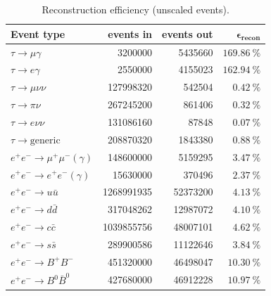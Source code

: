 \documentclass[12pt]{thesis}  %
\begin{document}
\begin{table}[h]
\centering
\begin{tabular}{lrrr}
\textbf{Event type}         & \textbf{events in} & \textbf{events out} & $\mathbf{\epsilon_{\text{recon}}}$ \\ \hline 
\rowcolor[HTML]{EFEFEF} 
$\tau\to\mu\gamma$       & \num{3200000}        & \num{5435660}      & $\SI{169.86}{\percent}$                   \\
\rowcolor[HTML]{EFEFEF} 
$\tau\to e \gamma$      & \num{2550000}       & \num{4155023}       & $\SI{162.94}{\percent}$                            \\
$\tau\to\mu\nu\nu$      & \num{127998320}         & \num{542504}          & $\SI{0.42}{\percent}$           \\
$\tau\to\pi\nu$         & \num{267245200}       & \num{861406}          & $\SI{0.32}{\percent}$            \\
$\tau\to e\nu\nu$       & \num{131086160}        & \num{87848}         & $\SI{0.07}{\percent}$      \\
$\tau\to\text{generic}$  & \num{208870320}       & \num{1843380}          & $\SI{0.88}{\percent}$         \\
$e^+ e^- \to \mu^+ \mu^- (\gamma)$   & \num{148600000}    & \num{5159295}     & $\SI{3.47}{\percent}$   \\
$e^+ e^- \to e^+ e^- (\gamma)$      & \num{15630000}      & \num{370496}       & $\SI{2.37}{\percent}$     \\
$e^+ e^- \to u \bar{u}$       & \num{1268991935}           & \num{52373200}  & $\SI{4.13}{\percent}$ \\
$e^+ e^- \to d \bar{d}$        & \num{317048262}       & \num{12987072}      & $\SI{4.10}{\percent}$       \\
$e^+ e^- \to c \bar{c}$        & \num{1039855756}       & \num{48007101}           & $\SI{4.62}{\percent}$          \\
$e^+ e^- \to s \bar{s}$       & \num{289900586}     & \num{11122646}            & $\SI{3.84}{\percent}$         \\
$e^+ e^- \to B^+ B^-$     & \num{451320000}       & \num{46498047}           & $\SI{10.30}{\percent}$          \\
$e^+ e^- \to B^0 \bar{B}^0$       & \num{427680000}           & \num{46912228}        & $\SI{10.97}{\percent}$              
\end{tabular}
\caption{Reconstruction efficiency (unscaled events).}
\label{tab:muon mode reconstruction values}
\end{table}
\end{document}
